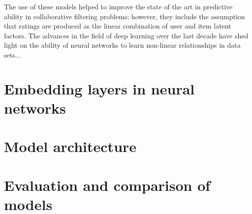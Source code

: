 The use of these models helped to improve the state of the art in predictive ability in collaborative filtering problems; however, they include the assumption that ratings are produced as the linear combination of user and item latent factors. The advances in the field of deep learning over the last decade have shed light on the ability of neural networks to learn non-linear relationships in data sets...

\section{Embedding layers in neural networks}

\section{Model architecture}

\section{Evaluation and comparison of models}

